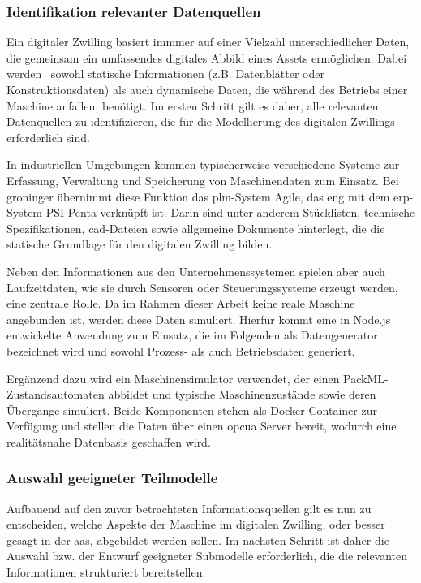 \subsubsection{Identifikation relevanter Datenquellen}
Ein digitaler Zwilling basiert immmer auf einer Vielzahl unterschiedlicher Daten, die gemeinsam ein umfassendes digitales Abbild eines Assets ermöglichen. 
Dabei werden%
\pagebreak 
~sowohl statische Informationen (z.B. Datenblätter oder Konstruktionsdaten) als auch dynamische Daten, die während des Betriebs einer Maschine anfallen, benötigt.
Im ersten Schritt gilt es daher, alle relevanten Datenquellen zu identifizieren, die für die Modellierung des digitalen Zwillings erforderlich sind.

In industriellen Umgebungen kommen typischerweise verschiedene Systeme zur Erfassung, Verwaltung und Speicherung von Maschinendaten zum Einsatz.
Bei groninger übernimmt diese Funktion das \acs{plm}-System Agile, das eng mit dem \acs{erp}-System PSI Penta verknüpft ist.
Darin sind unter anderem Stücklisten, technische Spezifikationen, \acs{cad}-Dateien sowie allgemeine Dokumente hinterlegt, die die statische Grundlage  für den digitalen Zwilling bilden.

Neben den Informationen aus den Unternehmenssystemen spielen aber auch Laufzeitdaten, wie sie durch Sensoren oder Steuerungssysteme erzeugt werden, eine zentrale Rolle.
Da im Rahmen dieser Arbeit keine reale Maschine angebunden ist, werden diese Daten simuliert.
Hierfür kommt eine in Node.js entwickelte Anwendung zum Einsatz, die im Folgenden als Datengenerator bezeichnet wird und sowohl Prozess- als auch Betriebsdaten generiert. 

Ergänzend dazu wird ein Maschinensimulator verwendet, der einen PackML-Zustands\-automaten abbildet und typische Maschinenzustände sowie deren Übergänge simuliert. 
Beide Komponenten stehen als Docker-Container zur Verfügung und stellen die Daten über einen \acs{opcua} Server bereit, wodurch eine realitätsnahe Datenbasis geschaffen wird.
\subsubsection{Auswahl geeigneter Teilmodelle}
Aufbauend auf den zuvor betrachteten Informationsquellen gilt es nun zu entscheiden, welche Aspekte der Maschine im digitalen Zwilling, oder besser gesagt in der \acs{aas}, abgebildet werden sollen.
Im nächsten Schritt ist daher die Auswahl bzw. der Entwurf geeigneter Submodelle erforderlich, die die relevanten Informationen strukturiert bereitstellen.

